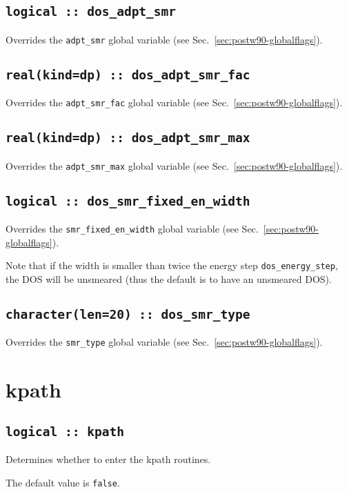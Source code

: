 \subsection[dos\_adpt\_smr]{\tt logical :: dos\_adpt\_smr}
Overrides the \verb#adpt_smr# global variable (see Sec.~\ref{sec:postw90-globalflags}).

\subsection[dos\_adpt\_smr\_fac]{\tt real(kind=dp) :: dos\_adpt\_smr\_fac}
Overrides the \verb#adpt_smr_fac# global variable (see
Sec.~\ref{sec:postw90-globalflags}).

\subsection[dos\_adpt\_smr\_max]{\tt real(kind=dp) ::
  dos\_adpt\_smr\_max}
Overrides the \verb#adpt_smr_max# global variable (see
Sec.~\ref{sec:postw90-globalflags}).

\subsection[dos\_smr\_fixed\_en\_width]{\tt logical :: dos\_smr\_fixed\_en\_width}
Overrides the \verb#smr_fixed_en_width# global variable (see
Sec.~\ref{sec:postw90-globalflags}).

Note that if the width is smaller than twice the energy step {\tt dos\_energy\_step}, the DOS
will be unsmeared (thus the default is to have an unsmeared DOS).


\subsection[dos\_smr\_type]{\tt  character(len=20) :: dos\_smr\_type}
Overrides the \verb#smr_type# global variable (see Sec.~\ref{sec:postw90-globalflags}).


\clearpage
\section{kpath}

\subsection[berry]{\tt logical :: kpath}
Determines whether to enter the kpath routines.

The default value is \verb#false#.


